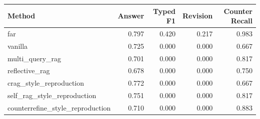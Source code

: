 \begin{tabular}{lrrrr}
\toprule
Method & Answer & Typed F1 & Revision & Counter Recall \\
\midrule
far & 0.797 & 0.420 & 0.217 & 0.983 \\
vanilla & 0.725 & 0.000 & 0.000 & 0.667 \\
multi\_query\_rag & 0.701 & 0.000 & 0.000 & 0.817 \\
reflective\_rag & 0.678 & 0.000 & 0.000 & 0.750 \\
crag\_style\_reproduction & 0.772 & 0.000 & 0.000 & 0.667 \\
self\_rag\_style\_reproduction & 0.751 & 0.000 & 0.000 & 0.817 \\
counterrefine\_style\_reproduction & 0.710 & 0.000 & 0.000 & 0.883 \\
\bottomrule
\end{tabular}
